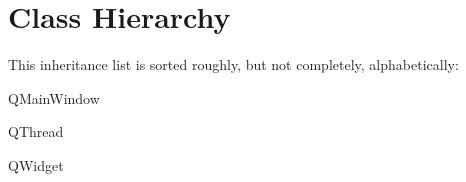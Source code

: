\section{Class Hierarchy}
This inheritance list is sorted roughly, but not completely, alphabetically\+:\begin{DoxyCompactList}
\item Q\+Main\+Window\begin{DoxyCompactList}
\item {}
\end{DoxyCompactList}
\item Q\+Thread\begin{DoxyCompactList}
\item {}
\end{DoxyCompactList}
\item Q\+Widget\begin{DoxyCompactList}
\item {}
\end{DoxyCompactList}
\end{DoxyCompactList}
